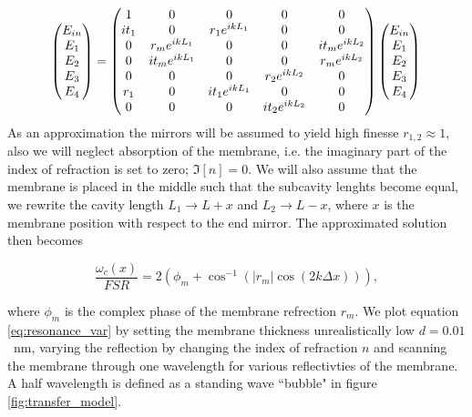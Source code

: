 \begin{equation}
\begin{pmatrix}
E_{in} \\
E_{1} \\
E_{2} \\
E_{3} \\
E_{4}
\end{pmatrix}
  =
\begin{pmatrix}
1 & 0 & 0 & 0 & 0\\
it_1 & 0 & r_1e^{ikL_1} & 0 & 0 \\
0 & r_me^{ikL_1} & 0 & 0 & it_me^{ikL_2} \\
0 & it_me^{ikL_1} & 0 & 0 & r_me^{ikL_2} \\
0 & 0 & 0 & r_2e^{ikL_2} & 0 \\
r_1 & 0 & it_1e^{ikL_1} & 0 & 0 \\
0 & 0 & 0 & it_2e^{ikL_2} & 0
\end{pmatrix} 
\begin{pmatrix}
E_{in} \\
E_{1} \\
E_{2} \\
E_{3} \\
E_{4}
\end{pmatrix} \\
\label{eq:transfer_matrix}
\end{equation}
\noindent
As an approximation the mirrors will be assumed to yield high finesse $r_{1,2} \approx 1$, also we will neglect absorption of the membrane, i.e. the imaginary part of the index of refraction is set to zero; $\Im[n] = 0$. We will also assume that the membrane is placed in the middle such that the subcavity lenghts become equal, we rewrite the cavity length $L_1 \rightarrow L + x$ and $L_2 \rightarrow L - x$, where $x$ is the membrane position with respect to the end mirror. The approximated solution \cite{jayich2008} then becomes

\begin{equation}
\frac{\omega_c(x)}{FSR} = 2(\phi_m + \cos^{-1}(\left|r_m\right|\cos(2k\Delta x))),
\label{eq:resonance_var}
\end{equation}

where $\phi_m$ is the complex phase of the membrane refrection $r_m$. We plot equation \eqref{eq:resonance_var} by setting the membrane thickness unrealistically low $d = 0.01$ \SI{}{\nano\meter}, varying the reflection by changing the index of refraction $n$ and scanning the membrane through one wavelength for various reflectivties of the membrane. A half wavelength is defined as a standing wave ``bubble" in figure \ref{fig:transfer_model}.

